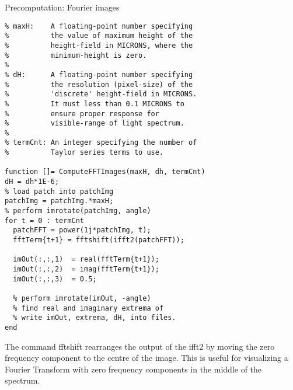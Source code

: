 \begin{algorithm}[H]
\caption{Precomputation: Fourier images}
\begin{lstlisting}
% maxH:    A floating-point number specifying 
%          the value of maximum height of the 
%          height-field in MICRONS, where the 
%          minimum-height is zero. 
%         
% dH:      A floating-point number specifying 
%          the resolution (pixel-size) of the 
%          'discrete' height-field in MICRONS. 
%          It must less than 0.1 MICRONS to 
%          ensure proper response for 
%          visible-range of light spectrum.
%
% termCnt: An integer specifying the number of 
%          Taylor series terms to use.

function []= ComputeFFTImages(maxH, dh, termCnt)
dH = dh*1E-6;
% load patch into patchImg
patchImg = patchImg.*maxH;
% perform imrotate(patchImg, angle)
for t = 0 : termCnt
  patchFFT = power(1j*patchImg, t);
  fftTerm{t+1} = fftshift(ifft2(patchFFT));
  
  imOut(:,:,1)  = real(fftTerm{t+1});
  imOut(:,:,2)  = imag(fftTerm{t+1});
  imOut(:,:,3)  = 0.5;
  
  % perform imrotate(imOut, -angle)
  % find real and imaginary extrema of 
  % write imOut, extrema, dH, into files.
end
\end{lstlisting}
\end{algorithm}

The command fftshift rearranges the output of the ifft2 by moving the zero frequency component to the centre of the image. This is useful for visualizing a Fourier Transform with zero frequency components in the middle of the spectrum.


